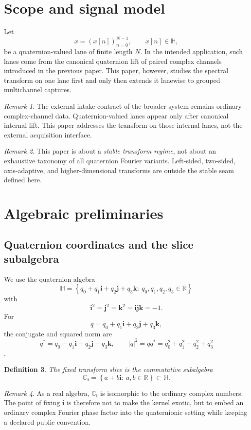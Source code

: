 \documentclass[11pt]{article}
\newtheorem{definition}{Definition}[section]
\theoremstyle{remark}
\newtheorem{remark}[definition]{Remark}
\newcommand{\R}{\mathbb{R}}
\newcommand{\C}{\mathbb{C}}
\newcommand{\HH}{\mathbb{H}}
\newcommand{\Ci}{\C_{\mathbf{i}}}
\newcommand{\ii}{\mathbf{i}}
\newcommand{\jj}{\mathbf{j}}
\newcommand{\kk}{\mathbf{k}}
\newcommand{\abs}[1]{\left\lvert #1 \right\rvert}
\newcommand{\set}[1]{\left\{ #1 \right\}}
\begin{document}
\section{Scope and signal model}

Let
\[
x=(x[n])_{n=0}^{N-1},\qquad x[n]\in\HH,
\]
be a quaternion-valued lane of finite length \(N\). In the intended application, such lanes come from the canonical quaternion lift of paired complex channels introduced in the previous paper. This paper, however, studies the spectral transform on one lane first and only then extends it lanewise to grouped multichannel captures.

\begin{remark}
The external intake contract of the broader system remains ordinary complex-channel data. Quaternion-valued lanes appear only after canonical internal lift. This paper addresses the transform on those internal lanes, not the external acquisition interface.
\end{remark}

\begin{remark}
This paper is about a \emph{stable transform regime}, not about an exhaustive taxonomy of all quaternion Fourier variants. Left-sided, two-sided, axis-adaptive, and higher-dimensional transforms are outside the stable seam defined here.
\end{remark}

\section{Algebraic preliminaries}

\subsection{Quaternion coordinates and the slice subalgebra}

We use the quaternion algebra
\[
\HH=\set{q_0+q_1\ii+q_2\jj+q_3\kk:\ q_0,q_1,q_2,q_3\in\R}
\]
with
\[
\ii^2=\jj^2=\kk^2=\ii\jj\kk=-1.
\]
For
\[
q=q_0+q_1\ii+q_2\jj+q_3\kk,
\]
the conjugate and squared norm are
\[
q^*=q_0-q_1\ii-q_2\jj-q_3\kk,
\qquad
\abs{q}^2=qq^*=q_0^2+q_1^2+q_2^2+q_3^2
\]
\citep{kuipers1999}.

\begin{definition}
The fixed transform slice is the commutative subalgebra
\[
\Ci=\set{a+b\ii:\ a,b\in\R}\subset\HH.
\]
\end{definition}

\begin{remark}
As a real algebra, \(\Ci\) is isomorphic to the ordinary complex numbers. The point of fixing \(\ii\) is therefore not to make the kernel exotic, but to embed an ordinary complex Fourier phase factor into the quaternionic setting while keeping a declared public convention.
\end{remark}
\end{document}
